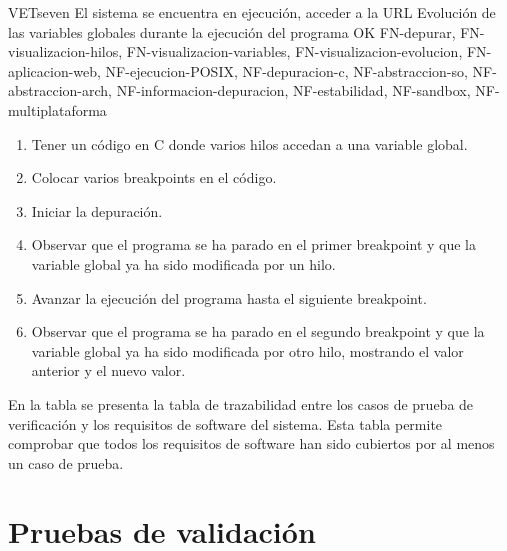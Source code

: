     \begin{testCase}{VET}{seven}
        {El sistema se encuentra en ejecución, acceder a la URL}
        {\NA}
        {Evolución de las variables globales durante la ejecución del programa}
        {OK}
        {FN-depurar, FN-visualizacion-hilos, FN-visualizacion-variables, FN-visualizacion-evolucion, FN-aplicacion-web, NF-ejecucion-POSIX, NF-depuracion-c, NF-abstraccion-so, NF-abstraccion-arch, NF-informacion-depuracion, NF-estabilidad, NF-sandbox, NF-multiplataforma}
        \begin{enumerate}
            \item Tener un código en C donde varios hilos accedan a una variable global.
            \item Colocar varios breakpoints en el código.
            \item Iniciar la depuración.
            \item Observar que el programa se ha parado en el primer breakpoint y que la variable global ya ha sido modificada por un hilo.
            \item Avanzar la ejecución del programa hasta el siguiente breakpoint.
            \item Observar que el programa se ha parado en el segundo breakpoint y que la variable global ya ha sido modificada por otro hilo, mostrando el valor anterior y el nuevo valor.
        \end{enumerate}
    \end{testCase}

En la tabla  se presenta la tabla de trazabilidad entre los casos de prueba de verificación y los requisitos de software del sistema. Esta tabla permite comprobar que todos los requisitos de software han sido cubiertos por al menos un caso de prueba.
\FloatBarrier
    
\begin{landscape}
\begin{table}[htb]
      {\traceabilityVETSR}
  \end{table}
\end{landscape}

\section{Pruebas de validación}\label{sec:validacion}

